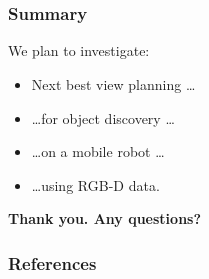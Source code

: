\documentclass[t]{beamer} %
\begin{document}
\section*{} 
\begin{frame}
	
	\frametitle{Summary}


	We plan to investigate:

	\vfill

	\begin{itemize}\itemsep10pt
		\item Next best view planning \ldots
		\item \ldots for object discovery \ldots
		\item \ldots on a mobile robot \ldots
		\item \ldots using RGB-D data.
	\end{itemize}

	\vfill

	\onslide<+->
	{
		\centering
		\textbf{Thank you. Any questions?}
	}

\end{frame}


\begin{frame}[allowframebreaks]
	\frametitle{ References }
	\footnotesize
    
    
\end{frame}
\end{document}
